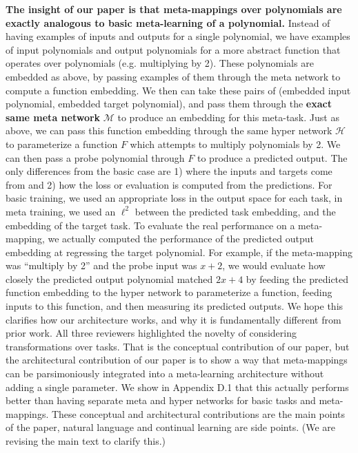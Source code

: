 \documentclass{article}
\begin{document}
\textbf{The insight of our paper is that meta-mappings over polynomials are exactly analogous to basic meta-learning of a polynomial.} Instead of having examples of inputs and outputs for a single polynomial, we have examples of input polynomials and output polynomials for a more abstract function that operates over polynomials (e.g. multiplying by 2). These polynomials are embedded as above, by passing examples of them through the meta network to compute a function embedding. We then can take these pairs of (embedded input polynomial, embedded target polynomial), and pass them through the \textbf{exact same meta network} $\mathcal{M}$ to produce an embedding for this meta-task. Just as above, we can pass this function embedding through the same hyper network $\mathcal{H}$ to parameterize a function $F$ which attempts to multiply polynomials by 2. We can then pass a probe polynomial through $F$ to produce a predicted output. The only differences from the basic case are 1) where the inputs and targets come from and 2) how the loss or evaluation is computed from the predictions. For basic training, we used an appropriate loss in the output space for each task, in meta training, we used an $\ell^2$ between the predicted task embedding, and the embedding of the target task. To evaluate the real performance on a meta-mapping, we actually computed the performance of the predicted output embedding at regressing the target polynomial. For example, if the meta-mapping was ``multiply by 2'' and the probe input was $x + 2$, we would evaluate how closely the predicted output polynomial matched $2x + 4$ by feeding the predicted function embedding to the hyper network to parameterize a function, feeding inputs to this function, and then measuring its predicted outputs. We hope this clarifies how our architecture works, and why it is fundamentally different from prior work. All three reviewers highlighted the novelty of considering transformations over tasks. That is the conceptual contribution of our paper, but the architectural contribution of our paper is to show a way that meta-mappings can be parsimoniously integrated into a meta-learning architecture without adding a single parameter. We show in Appendix D.1 that this actually performs better than having separate meta and hyper networks for basic tasks and meta-mappings. These conceptual and architectural contributions are the main points of the paper, natural language and continual learning are side points. (We are revising the main text to clarify this.) \par 
{}
\end{document}
